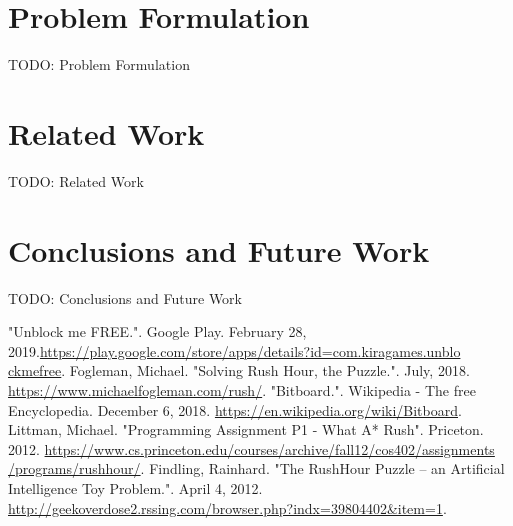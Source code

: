 \documentclass[conference]{IEEEtran}
\begin{document}
\section{Problem Formulation}

TODO: Problem Formulation

\section{Related Work}

TODO: Related Work

\section{Conclusions and Future Work}

TODO: Conclusions and Future Work

\begin{thebibliography}{00}
    
 "Unblock me FREE.". Google Play. February 28, 2019.\href{https://play.google.com/store/apps/details?id=com.kiragames.unblockmefree}{https://play.google.com/store/apps/details?id=com.kiragames.unblo\\ckmefree}.
 Fogleman, Michael. "Solving Rush Hour, the Puzzle.". July, 2018. \href{https://www.michaelfogleman.com/rush/}{https://www.michaelfogleman.com/rush/}.
 "Bitboard.". Wikipedia - The free Encyclopedia. December 6, 2018. \href{https://en.wikipedia.org/wiki/Bitboard}{https://en.wikipedia.org/wiki/Bitboard}.
 Littman, Michael. "Programming Assignment P1 - What A* Rush". Priceton. 2012. \href{https://www.cs.princeton.edu/courses/archive/fall12/cos402/assignments/programs/rushhour/}{https://www.cs.princeton.edu/courses/archive/fall12/cos402/assignments\\/programs/rushhour/}.
 Findling, Rainhard. "The RushHour Puzzle – an Artificial Intelligence Toy Problem.". April 4, 2012. \href{http://geekoverdose2.rssing.com/browser.php?indx=39804402\&item=1}{http://geekoverdose2.rssing.com/browser.php?indx=39804402\&item=1}.

\end{thebibliography}
\end{document}
